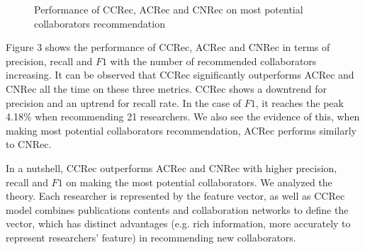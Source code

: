\documentclass{acm_proc_article-sp}
\begin{document}
\begin{figure}
\centering
{}
\caption{Performance of CCRec, ACRec and CNRec on most potential collaborators recommendation}
\label{fig:3}       %
\end{figure}

Figure 3 shows the performance of CCRec, ACRec and CNRec in terms of precision, recall and $F1$ with the number of recommended collaborators increasing. It can be observed that CCRec significantly outperforms ACRec and CNRec all the time on these three metrics. CCRec shows a downtrend for precision and an uptrend for recall rate. In the case of $F1$, it reaches the peak 4.18\% when recommending 21 researchers. We also see the evidence of this, when making most potential collaborators recommendation, ACRec performs similarly to CNRec.

In a nutshell, CCRec outperforms ACRec and CNRec with higher precision, recall and $F1$ on making the most potential collaborators. We analyzed the theory. Each researcher is represented by the feature vector, as well as CCRec model combines publications contents and collaboration networks to define the vector, which has distinct advantages (e.g. rich information, more accurately to represent researchers' feature) in recommending new collaborators.

\end{document}
